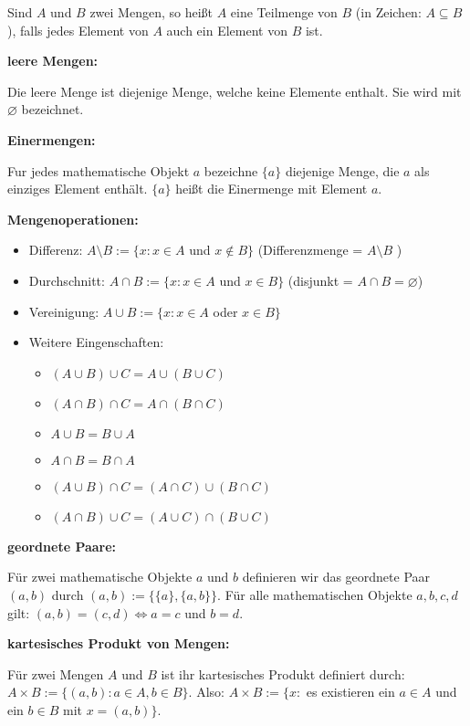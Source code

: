 \documentclass[analysis.tex]{subfiles}
\begin{document}
\begin{description}
\begin{definition}[Teilmengen]
      Sind $A$ und $B$ zwei Mengen, so hei\ss{}t $A$ eine Teilmenge von $B$ (in Zeichen: $A \subseteq B$), falls jedes Element von $A$ auch
      ein Element von $B$ ist.
    \end{definition}
    \item \textbf{leere Mengen:}
    \begin{definition}
      Die leere Menge ist diejenige Menge, welche keine Elemente enthalt. Sie wird mit $\varnothing$ bezeichnet.
    \end{definition}
    \item \textbf{Einermengen:}
    \begin{definition}[Einermengen]
      Fur jedes mathematische Objekt $a$ bezeichne $\{a\}$ diejenige Menge, die $a$ als einziges Element enth\"alt. $\{a\}$ hei\ss{}t die
      Einermenge mit Element $a$.
    \end{definition}
    \item \textbf{Mengenoperationen:}
    \begin{itemize}
      \item Differenz: $A \setminus B := \{x : x \in A$ und $x \notin B\}$ (Differenzmenge = $A \setminus B$ )
      \item Durchschnitt: $A \cap B := \{x : x \in A$ und $x \in B\}$ (disjunkt = $A \cap B = \varnothing$)
      \item Vereinigung: $A \cup B := \{x : x \in A$ oder $x \in B\}$
      \item Weitere Eingenschaften:
      \begin{itemize}
        \item $(A \cup B) \cup C = A \cup (B \cup C)$
        \item $(A \cap B) \cap C = A \cap (B \cap C)$
        \item $A \cup B = B \cup A$
        \item $A \cap B = B \cap A$
        \item $(A \cup B) \cap C = (A \cap C) \cup (B \cap C)$
        \item $(A \cap B) \cup C = (A \cup C) \cap (B \cup C)$
      \end{itemize}
    \end{itemize}
    \item \textbf{geordnete Paare:}
    \begin{definition}
      F\"ur zwei mathematische Objekte $a$ und $b$ definieren wir das geordnete Paar $(a, b)$ durch $(a, b) := \{\{a\}, \{a, b\}\}$.
      F\"ur alle mathematischen Objekte $a, b, c, d$ gilt: $(a, b) = (c, d) \Leftrightarrow a = c$ und $b = d$.
    \end{definition}
    \item \textbf{kartesisches Produkt von Mengen:}
    \begin{definition}
      F\"ur zwei Mengen $A$ und $B$ ist ihr kartesisches Produkt definiert durch: $A \times B  := \{(a, b) : a \in A, b \in B\}$. Also:
      $A \times B := \{x :$ es existieren ein $a \in A$ und ein $b \in B$ mit $x = (a, b)\}$.
    \end{definition}
  \end{description}
\end{document}
